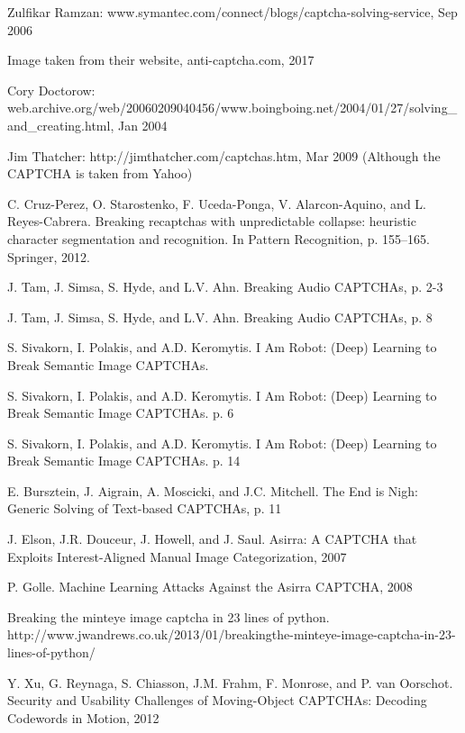 \documentclass[a4paper]{IEEEtran}
\begin{document}
\newpage{}
\begin{thebibliography}{30}

Zulfikar Ramzan: www.symantec.com/connect/blogs/captcha-solving-service, Sep 2006

Image taken from their website, anti-captcha.com, 2017

Cory Doctorow: web.archive.org/web/20060209040456/www.boingboing.net/2004/01/27/solving\_and\_creating.html, Jan 2004

Jim Thatcher: http://jimthatcher.com/captchas.htm, Mar 2009 (Although the CAPTCHA is taken from Yahoo)

C. Cruz-Perez, O. Starostenko, F. Uceda-Ponga, V. Alarcon-Aquino, and L. Reyes-Cabrera. 	Breaking recaptchas with unpredictable collapse: heuristic character segmentation and recognition. In Pattern Recognition, p. 155–165. Springer, 2012.

J. Tam, J. Simsa, S. Hyde, and L.V. Ahn. Breaking Audio CAPTCHAs, p. 2-3

J. Tam, J. Simsa, S. Hyde, and L.V. Ahn. Breaking Audio CAPTCHAs, p. 8

S. Sivakorn, I. Polakis, and A.D. Keromytis. I Am Robot: (Deep) Learning to Break Semantic Image CAPTCHAs.

S. Sivakorn, I. Polakis, and A.D. Keromytis. I Am Robot: (Deep) Learning to Break Semantic Image CAPTCHAs. p. 6

S. Sivakorn, I. Polakis, and A.D. Keromytis. I Am Robot: (Deep) Learning to Break Semantic Image CAPTCHAs. p. 14

E. Bursztein, J. Aigrain, A. Moscicki, and J.C. Mitchell. The End is Nigh: Generic Solving of Text-based CAPTCHAs, p. 11

J. Elson, J.R. Douceur, J. Howell, and J. Saul. Asirra: A CAPTCHA that Exploits Interest-Aligned Manual Image Categorization, 2007

P. Golle. Machine Learning Attacks Against the Asirra CAPTCHA, 2008

Breaking the minteye image captcha in 23 lines of python. http://www.jwandrews.co.uk/2013/01/breakingthe-minteye-image-captcha-in-23-lines-of-python/

Y. Xu, G. Reynaga, S. Chiasson, J.M. Frahm, F. Monrose, and P. van Oorschot. Security and Usability Challenges of Moving-Object CAPTCHAs: Decoding Codewords in Motion, 2012


\end{thebibliography}
\end{document}
